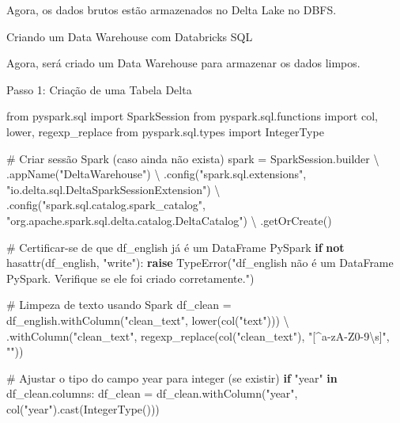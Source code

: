 \documentclass[
  letterpaper,
  DIV=11,
  numbers=noendperiod]{scrartcl}
\newenvironment{Shaded}{\begin{snugshade}}{\end{snugshade}}
\newcommand{\BuiltInTok}[1]{\textcolor[rgb]{0.00,0.23,0.31}{#1}}
\newcommand{\CommentTok}[1]{\textcolor[rgb]{0.37,0.37,0.37}{#1}}
\newcommand{\ControlFlowTok}[1]{\textcolor[rgb]{0.00,0.23,0.31}{\textbf{#1}}}
\newcommand{\ImportTok}[1]{\textcolor[rgb]{0.00,0.46,0.62}{#1}}
\newcommand{\KeywordTok}[1]{\textcolor[rgb]{0.00,0.23,0.31}{\textbf{#1}}}
\newcommand{\NormalTok}[1]{\textcolor[rgb]{0.00,0.23,0.31}{#1}}
\newcommand{\OperatorTok}[1]{\textcolor[rgb]{0.37,0.37,0.37}{#1}}
\newcommand{\PreprocessorTok}[1]{\textcolor[rgb]{0.68,0.00,0.00}{#1}}
\newcommand{\StringTok}[1]{\textcolor[rgb]{0.13,0.47,0.30}{#1}}
\begin{document}
Agora, os dados brutos estão armazenados no Delta Lake no DBFS.

Criando um Data Warehouse com Databricks SQL

Agora, será criado um Data Warehouse para armazenar os dados limpos.

Passo 1: Criação de uma Tabela Delta

\begin{Shaded}
\begin{Highlighting}[]
\ImportTok{from}\NormalTok{ pyspark.sql }\ImportTok{import}\NormalTok{ SparkSession}
\ImportTok{from}\NormalTok{ pyspark.sql.functions }\ImportTok{import}\NormalTok{ col, lower, regexp\_replace}
\ImportTok{from}\NormalTok{ pyspark.sql.types }\ImportTok{import}\NormalTok{ IntegerType}

\CommentTok{\# Criar sessão Spark (caso ainda não exista)}
\NormalTok{spark }\OperatorTok{=}\NormalTok{ SparkSession.builder }\OperatorTok{\textbackslash{}}
\NormalTok{    .appName(}\StringTok{"DeltaWarehouse"}\NormalTok{) }\OperatorTok{\textbackslash{}}
\NormalTok{    .config(}\StringTok{"spark.sql.extensions"}\NormalTok{, }\StringTok{"io.delta.sql.DeltaSparkSessionExtension"}\NormalTok{) }\OperatorTok{\textbackslash{}}
\NormalTok{    .config(}\StringTok{"spark.sql.catalog.spark\_catalog"}\NormalTok{, }\StringTok{"org.apache.spark.sql.delta.catalog.DeltaCatalog"}\NormalTok{) }\OperatorTok{\textbackslash{}}
\NormalTok{    .getOrCreate()}

\CommentTok{\# Certificar{-}se de que df\_english já é um DataFrame PySpark}
\ControlFlowTok{if} \KeywordTok{not} \BuiltInTok{hasattr}\NormalTok{(df\_english, }\StringTok{"write"}\NormalTok{):}
    \ControlFlowTok{raise} \PreprocessorTok{TypeError}\NormalTok{(}\StringTok{"df\_english não é um DataFrame PySpark. Verifique se ele foi criado corretamente."}\NormalTok{)}

\CommentTok{\# Limpeza de texto usando Spark}
\NormalTok{df\_clean }\OperatorTok{=}\NormalTok{ df\_english.withColumn(}\StringTok{"clean\_text"}\NormalTok{, lower(col(}\StringTok{"text"}\NormalTok{))) }\OperatorTok{\textbackslash{}}
\NormalTok{                     .withColumn(}\StringTok{"clean\_text"}\NormalTok{, regexp\_replace(col(}\StringTok{"clean\_text"}\NormalTok{), }\StringTok{"[\^{}a{-}zA{-}Z0{-}9\textbackslash{}s]"}\NormalTok{, }\StringTok{""}\NormalTok{))}

\CommentTok{\# Ajustar o tipo do campo \textquotesingle{}year\textquotesingle{} para integer (se existir)}
\ControlFlowTok{if} \StringTok{"year"} \KeywordTok{in}\NormalTok{ df\_clean.columns:}
\NormalTok{    df\_clean }\OperatorTok{=}\NormalTok{ df\_clean.withColumn(}\StringTok{"year"}\NormalTok{, col(}\StringTok{"year"}\NormalTok{).cast(IntegerType()))}


\end{Highlighting}
\end{Shaded}
\end{document}
